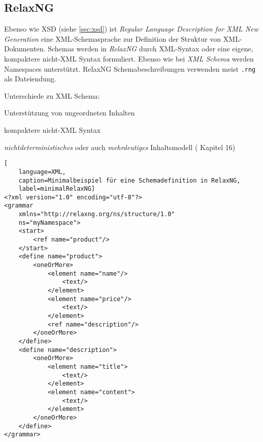\subsection{RelaxNG}
\label{sec:relaxng}

Ebenso wie XSD (siehe \cref{sec:xsd}) ist \emph{Regular Language Description for XML New Generation} eine XML-Schemasprache zur Definition der Struktur von XML-Dokumenten. Schemas werden in \emph{RelaxNG} durch XML-Syntax oder eine eigene, kompaktere nicht-XML Syntax formuliert. Ebenso wie bei \emph{XML Schema} werden Namespaces unterstützt. RelaxNG Schemabeschreibungen verwenden meist \texttt{.rng} als Dateiendung.

Unterschiede zu XML Schema:
\begin{compactitem}
    \item Unterstützung von ungeordneten Inhalten
    \item kompaktere nicht-XML Syntax
    \item \emph{nichtdeterministisches} oder auch \emph{mehrdeutiges} Inhaltsmodell (\cite{RelaxNGVlist} Kapitel 16)%
\end{compactitem}

\begin{lstlisting}[
    language=XML, 
    caption=Minimalbeispiel für eine Schemadefinition in RelaxNG, 
    label=minimalRelaxNG]
<?xml version="1.0" encoding="utf-8"?>
<grammar 
    xmlns="http://relaxng.org/ns/structure/1.0"
    ns="myNamespace">
    <start>
        <ref name="product"/>
    </start>
    <define name="product">
        <oneOrMore>
            <element name="name"/>
                <text/>
            </element>
            <element name="price"/>
                <text/>
            </element>
            <ref name="description"/>
        </oneOrMore>
    </define>
    <define name="description">
        <oneOrMore>
            <element name="title">
                <text/>
            </element>
            <element name="content">
                <text/>
            </element>
        </oneOrMore>
    </define>
</grammar>
\end{lstlisting}
